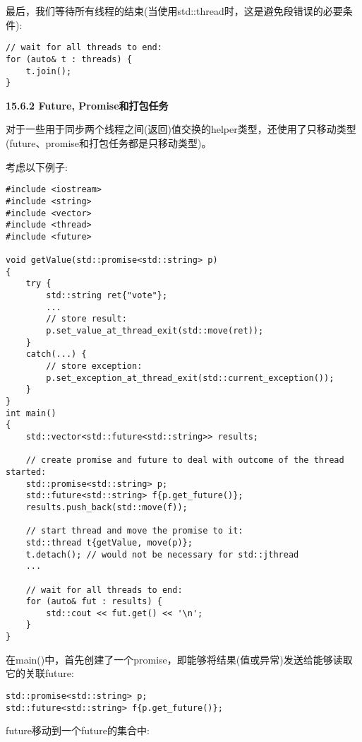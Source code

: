 最后，我们等待所有线程的结束(当使用std::thread时，这是避免段错误的必要条件):\par

\begin{lstlisting}[caption={}]
// wait for all threads to end:
for (auto& t : threads) {
	t.join();
}
\end{lstlisting}

\hspace*{\fill} \par %
\textbf{15.6.2 Future, Promise和打包任务}

对于一些用于同步两个线程之间(返回)值交换的helper类型，还使用了只移动类型(future、promise和打包任务都是只移动类型)。\par

考虑以下例子:\par

{\color{red}{lib/future.cpp}}\par

\begin{lstlisting}[caption={}]
#include <iostream>
#include <string>
#include <vector>
#include <thread>
#include <future>

void getValue(std::promise<std::string> p)
{
	try {
		std::string ret{"vote"};
		...
		// store result:
		p.set_value_at_thread_exit(std::move(ret));
	}
	catch(...) {
		// store exception:
		p.set_exception_at_thread_exit(std::current_exception());
	}
}
int main()
{
	std::vector<std::future<std::string>> results;
	
	// create promise and future to deal with outcome of the thread started:
	std::promise<std::string> p;
	std::future<std::string> f{p.get_future()};
	results.push_back(std::move(f));
	
	// start thread and move the promise to it:
	std::thread t{getValue, move(p)};
	t.detach(); // would not be necessary for std::jthread
	...
	
	// wait for all threads to end:
	for (auto& fut : results) {
		std::cout << fut.get() << '\n';
	}
}
\end{lstlisting}

在main()中，首先创建了一个promise，即能够将结果(值或异常)发送给能够读取它的关联future:\par

\begin{lstlisting}[caption={}]
std::promise<std::string> p;
std::future<std::string> f{p.get_future()};
\end{lstlisting}

future移动到一个future的集合中:\par

